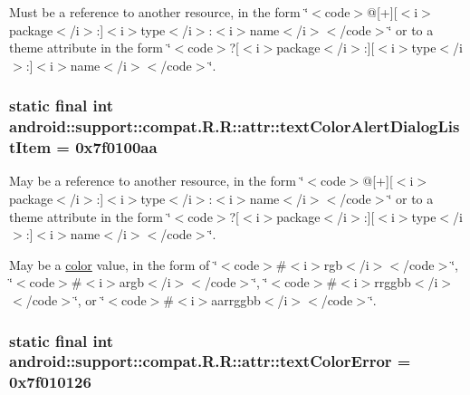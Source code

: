 Must be a reference to another resource, in the form \char`\"{}$<$code$>$@\mbox{[}+\mbox{]}\mbox{[}$<$i$>$package$<$/i$>$:\mbox{]}$<$i$>$type$<$/i$>$:$<$i$>$name$<$/i$>$$<$/code$>$\char`\"{} or to a theme attribute in the form \char`\"{}$<$code$>$?\mbox{[}$<$i$>$package$<$/i$>$:\mbox{]}\mbox{[}$<$i$>$type$<$/i$>$:\mbox{]}$<$i$>$name$<$/i$>$$<$/code$>$\char`\"{}. \hypertarget{classandroid_1_1support_1_1compat_1_1_r_1_1attr_8cbca57750c4c7bced6a38acd5437f39}{
\subsubsection[{textColorAlertDialogListItem}]{\setlength{\rightskip}{0pt plus 5cm}static final int android::support::compat.R.R::attr::textColorAlertDialogListItem = 0x7f0100aa}}
\label{classandroid_1_1support_1_1compat_1_1_r_1_1attr_8cbca57750c4c7bced6a38acd5437f39}


May be a reference to another resource, in the form \char`\"{}$<$code$>$@\mbox{[}+\mbox{]}\mbox{[}$<$i$>$package$<$/i$>$:\mbox{]}$<$i$>$type$<$/i$>$:$<$i$>$name$<$/i$>$$<$/code$>$\char`\"{} or to a theme attribute in the form \char`\"{}$<$code$>$?\mbox{[}$<$i$>$package$<$/i$>$:\mbox{]}\mbox{[}$<$i$>$type$<$/i$>$:\mbox{]}$<$i$>$name$<$/i$>$$<$/code$>$\char`\"{}. 

May be a \hyperlink{classandroid_1_1support_1_1compat_1_1_r_1_1color}{color} value, in the form of \char`\"{}$<$code$>$\#$<$i$>$rgb$<$/i$>$$<$/code$>$\char`\"{}, \char`\"{}$<$code$>$\#$<$i$>$argb$<$/i$>$$<$/code$>$\char`\"{}, \char`\"{}$<$code$>$\#$<$i$>$rrggbb$<$/i$>$$<$/code$>$\char`\"{}, or \char`\"{}$<$code$>$\#$<$i$>$aarrggbb$<$/i$>$$<$/code$>$\char`\"{}. \hypertarget{classandroid_1_1support_1_1compat_1_1_r_1_1attr_693b21b4019e1a4ff8f8ce90fd9ced49}{
\subsubsection[{textColorError}]{\setlength{\rightskip}{0pt plus 5cm}static final int android::support::compat.R.R::attr::textColorError = 0x7f010126}}
\label{classandroid_1_1support_1_1compat_1_1_r_1_1attr_693b21b4019e1a4ff8f8ce90fd9ced49}


